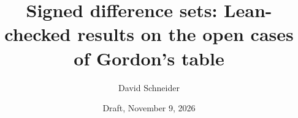 \documentclass[11pt]{amsart}
\title[Open cases of the SDS table]{Signed difference sets: Lean-checked results on the
open cases of Gordon's table}
\author{David Schneider}
\date{Draft, November 9, 2026}
\theoremstyle{plain}
\theoremstyle{definition}
\theoremstyle{remark}
\begin{document}
\maketitle

\begin{abstract}

\end{abstract}














\appendix




\end{document}
